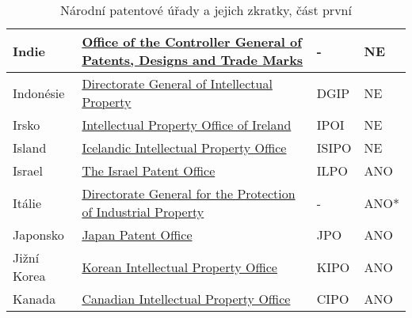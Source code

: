 \begin{table}[H]
\begin{tabular}{|>{\centering\arraybackslash}p{2.2cm}|>{\centering\arraybackslash}p{7cm}|>{\centering\arraybackslash}p{2cm}|>{\centering\arraybackslash}p{1cm}|}
	\hline
	Indie & \href{http://www.ipindia.nic.in/}{Office of the Controller General of Patents, Designs and Trade Marks}  & -    & NE    \\ 
	\hline
	Indonésie & \href{http://www.dgip.go.id/}{Directorate General of Intellectual Property}  & DGIP & NE        \\ 
	\hline
	Irsko & \href{https://www.ipoi.gov.ie/en/}{Intellectual Property Office of Ireland}  & IPOI   & NE      \\ 
	\hline
	Island & \href{https://www.isipo.is/}{Icelandic Intellectual Property Office}  & ISIPO    & NE     \\ 
	\hline
	Israel & \href{https://www.gov.il/en/departments/ilpo}{The Israel Patent Office}  & ILPO    & ANO     \\ 
	\hline
	Itálie & \href{https://uibm.mise.gov.it/index.php/it/}{Directorate General for the Protection of Industrial Property}  & -    & ANO*     \\ 
	\hline
	Japonsko & \href{https://www.jpo.go.jp/e/index.html}{Japan Patent Office}  & JPO  & ANO       \\ 
	\hline
	Jižní Korea & \href{http://www.kipo.go.kr/}{Korean Intellectual Property Office}  & KIPO   & ANO      \\ 
	\hline	
	Kanada & \href{https://www.ic.gc.ca/}{Canadian Intellectual Property Office}  & CIPO  & ANO      \\ 
	\hline
	\end{tabular}
	\caption{Národní patentové úřady a jejich zkratky, část první}
	\label{tab:table_offices1}
	\end{table}
\newpage
